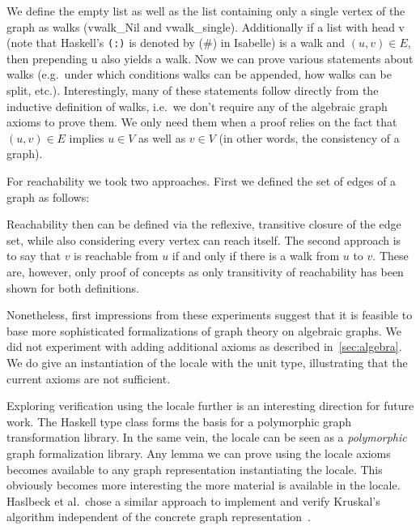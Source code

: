 \documentclass{article}
\newcommand{\hs}{\texttt}
\newcommand*{\term}[1]{{\isaspacing\isastyle }}
\newcommand*{\Term}[1]{{\isaspacing\isastyle #1}}
\begin{document}
\vspace{3mm}
\term{terms/vwalk_def}
\vspace{3mm}\newline
We define the empty list as well as the list containing only a single vertex of
the graph as walks (\Term{vwalk\_Nil} and \Term{vwalk\_single}). Additionally if
a list with head \Term{v} (note that Haskell's \hs{(:)} is denoted by \Term{(\#)} in
Isabelle) is a walk and $(u,v) \in E$, then prepending \Term{u} also yields a
walk. Now we can prove various statements about walks (e.g.\ under which
conditions walks can be appended, how walks can be split, etc.). Interestingly,
many of these statements follow directly
from the inductive definition of walks, i.e.\ we don't require any of the
algebraic graph axioms to prove them. We only need them when a proof relies on
the fact that $(u,v) \in E$ implies $u \in V$ as well as $v \in V$ (in other
words, the consistency of a graph).

For reachability we took two approaches. First we defined the set of edges of a
graph as follows:

\vspace{3mm}
\term{terms/edge_set_def}
\vspace{3mm}\newline
Reachability then can be defined via the reflexive, transitive closure of the
edge set, while also considering every vertex can reach itself. The second approach is to say that $v$ is reachable from $u$ if and
only if there is a walk from $u$ to $v$. These are, however, only proof of
concepts as only transitivity of reachability has been shown for both definitions.

Nonetheless, first impressions from these experiments suggest that it is
feasible to base more sophisticated formalizations of graph theory on algebraic
graphs. We did not experiment with adding additional axioms as described
in~\autoref{sec:algebra}. We do give an instantiation of the locale with the
unit type, illustrating that the current axioms are not sufficient.

Exploring verification using the locale further is an interesting direction for
future work. The Haskell type class forms the basis for a polymorphic graph
transformation library. In the same vein, the locale can be seen as a
\textit{polymorphic} graph formalization
library. Any lemma we can prove using the locale axioms becomes available to any
graph representation instantiating the locale. This obviously becomes more
interesting the more material is available in the locale. Haslbeck et al.\ chose
a similar approach to implement and verify Kruskal's algorithm independent of
the concrete graph representation~\cite{Kruskal-AFP}.
\end{document}
